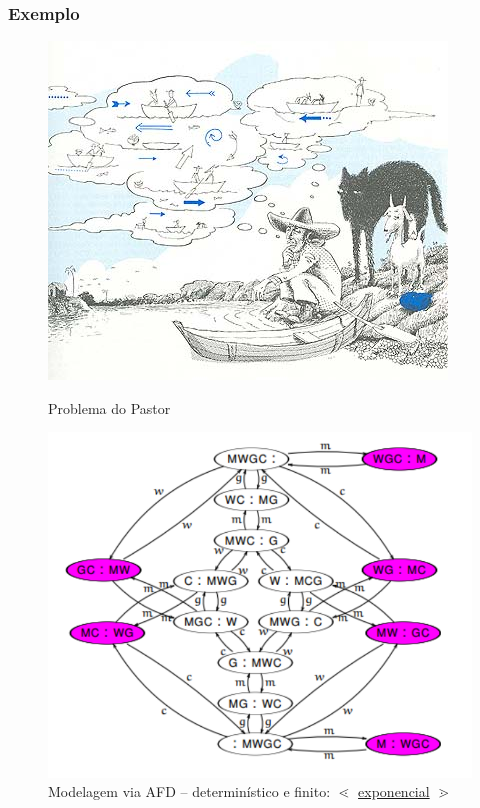 \documentclass[10pt]{beamer}
\begin{document}
\begin{frame}[fragile]
\frametitle{Exemplo}
\begin{figure}[!ht]
	\centering
	
\begin{minipage}[b]{0.475\linewidth}
	\centering
	\includegraphics[width=\textwidth, height =.48\textheight]
{figuras/ilustra_pastor.jpg}
		\caption{Problema do Pastor}
\end{minipage}
\hspace{0.2cm}
\begin{minipage}[b]{0.475\linewidth}
	\centering
	\includegraphics[width=\textwidth, height =.6\textheight]{figuras/espaco_estados_PASTOR.pdf}
	\caption{Modelagem via AFD -- determinístico e finito: $\lessdot$ \underline{exponencial} $\gtrdot$}
\end{minipage}
\end{figure}


\end{frame}
\end{document}
